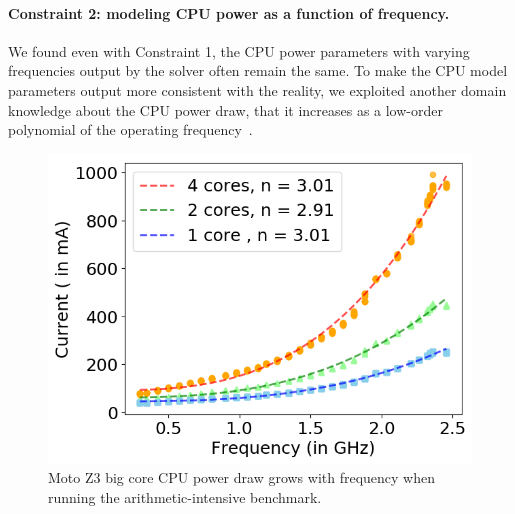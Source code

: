 \paragraph{Constraint 2: modeling CPU power as a function of frequency.}
We found even with Constraint 1, the CPU power parameters with varying
frequencies output by the solver often remain the same.  To make the
CPU model parameters output more consistent with the reality, we
exploited another domain knowledge about the CPU power draw, that it
increases as a low-order polynomial of the operating
frequency~\cite{armdvfs,rizvandi2011some}.
%
\begin{figure}[tp]
    \centering
    \includegraphics[width=0.80\columnwidth]{figures/cpu_characteristics.png}
    \caption{Moto Z3 big core CPU power draw grows with frequency 
    when running the arithmetic-intensive benchmark.}
    \label{fig:cpu_characteristic}
    \vspace{-0.1in}
\end{figure}
\fi
%
